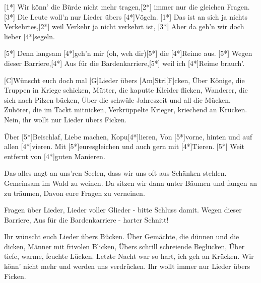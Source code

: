 

\hfill{}

\begin{guitar}
	[1*] Wir könn' die Bürde nicht mehr tragen,[2*] immer nur die gleichen Fragen.
	[3*] Die Leute woll'n nur Lieder übers [4*]Vögeln.
	[1*] Das ist an sich ja nichts Verkehrtes,[2*] weil Verkehr ja nicht verkehrt ist,
	[3*] Aber da geh'n wir doch lieber [4*]segeln.
	
	[5*] Denn langsam [4*]geh'n mir (oh, weh dir)[5*] die [4*]Reime aus.
	[5*] Wegen dieser Barriere,[4*] Aus für die Bardenkarriere,[5*] weil ich [4*]Reime brauch'.
	
	[C]Wünscht euch doch mal [G]Lieder übers [Am]Stri[F]cken,
	Über Könige, die Truppen in Kriege schicken,
	Mütter, die kaputte Kleider flicken,
	Wanderer, die sich nach Pilzen bücken,
	Über die schwüle Jahreszeit und all die Mücken,
	Zuhörer, die im Tackt mitnicken,
	Verkrüppelte Krieger, kriechend an Krücken.
	Nein, ihr wollt nur Lieder übers Ficken.
	
	Über [5*]Beischlaf, Liebe machen, Kopu[4*]lieren,
	Von [5*]vorne, hinten und auf allen [4*]vieren.
	Mit [5*]euresgleichen und auch gern mit [4*]Tieren.
	[5*] Weit entfernt von [4*]guten Manieren.
	
	\pagebreak
	
	Das alles nagt an uns'ren Seelen, dass wir uns oft aus Schänken stehlen.
	Gemeinsam im Wald zu weinen.
	Da sitzen wir dann unter Bäumen und fangen an zu träumen,
	Davon eure Fragen zu verneinen.
	
	Fragen über Lieder, Lieder voller Glieder - bitte Schluss damit.
	Wegen dieser Barriere, Aus für die Bardenkarriere - harter Schnitt!
	
	Ihr wünscht euch Lieder übers Bücken.
	Über Gemächte, die dünnen und die dicken,
	Männer mit frivolen Blicken,
	Übers schrill schreiende Beglücken,
	Über tiefe, warme, feuchte Lücken.
	Letzte Nacht war so hart, ich geh an Krücken.
	Wir könn' nicht mehr und werden uns verdrücken.
	Ihr wollt immer nur Lieder übers Ficken.
	

\end{guitar}
